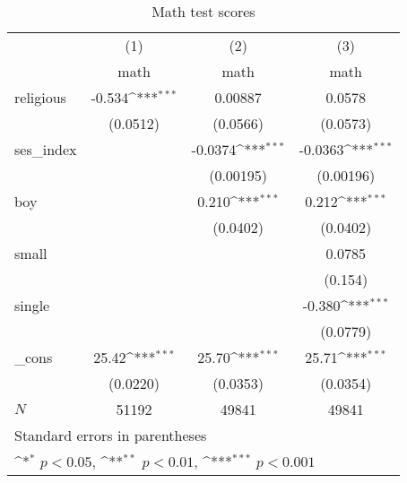 \begin{table}[htbp]\centering
\def\sym#1{\ifmmode^{#1}\else\(^{#1}\)\fi}
\caption{Math test scores}
\begin{tabular}{l*{3}{c}}
\hline\hline
            &\multicolumn{1}{c}{(1)}&\multicolumn{1}{c}{(2)}&\multicolumn{1}{c}{(3)}\\
            &\multicolumn{1}{c}{math}&\multicolumn{1}{c}{math}&\multicolumn{1}{c}{math}\\
\hline
religious   &      -0.534\sym{***}&     0.00887         &      0.0578         \\
            &    (0.0512)         &    (0.0566)         &    (0.0573)         \\
[1em]
ses\_index   &                     &     -0.0374\sym{***}&     -0.0363\sym{***}\\
            &                     &   (0.00195)         &   (0.00196)         \\
[1em]
boy         &                     &       0.210\sym{***}&       0.212\sym{***}\\
            &                     &    (0.0402)         &    (0.0402)         \\
[1em]
small       &                     &                     &      0.0785         \\
            &                     &                     &     (0.154)         \\
[1em]
single      &                     &                     &      -0.380\sym{***}\\
            &                     &                     &    (0.0779)         \\
[1em]
\_cons      &       25.42\sym{***}&       25.70\sym{***}&       25.71\sym{***}\\
            &    (0.0220)         &    (0.0353)         &    (0.0354)         \\
\hline
\(N\)       &       51192         &       49841         &       49841         \\
\hline\hline
\multicolumn{4}{l}{\footnotesize Standard errors in parentheses}\\
\multicolumn{4}{l}{\footnotesize \sym{*} \(p<0.05\), \sym{**} \(p<0.01\), \sym{***} \(p<0.001\)}\\
\end{tabular}
\end{table}
